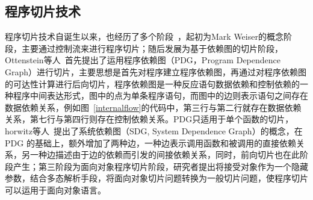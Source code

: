 \subsection{程序切片技术}
程序切片技术自诞生以来，也经历了多个阶段~\cite{slices:xu2005brief}，起初为Mark Weiser的概念阶段，主要通过控制流来进行程序切片；随后发展为基于依赖图的切片阶段，Ottenstein等人~\cite{slices:ottenstein1984program}首先提出了运用程序依赖图（PDG，Program Dependence Graph）进行切片，主要思想是首先对程序建立程序依赖图，再通过对程序依赖图的可达性计算进行后向切片，程序依赖图是一种反应语句数据依赖和控制依赖的一种程序中间表达形式，图中的点为单条程序语句，而图中的边则表示语句之间存在数据依赖关系，例如图~\ref{internalflow}的代码中，第三行与第二行就存在数据依赖关系，第七行与第四行则存在控制依赖关系。PDG只适用于单个函数的切片，horwitz等人~\cite{slices:horwitz1990}提出了系统依赖图（SDG, System Dependence Graph）的概念，在 PDG 的基础上，额外增加了两种边，一种边表示调用函数和被调用的直接依赖关系，另一种边描述由于边的依赖而引发的间接依赖关系，同时，前向切片也在此阶段产生；第三阶段为面向对象程序切片阶段，研究者提出将接受对象作为一个隐藏参数，结合多态解析手段，将面向对象切片问题转换为一般切片问题，使程序切片可以运用于面向对象语言。


